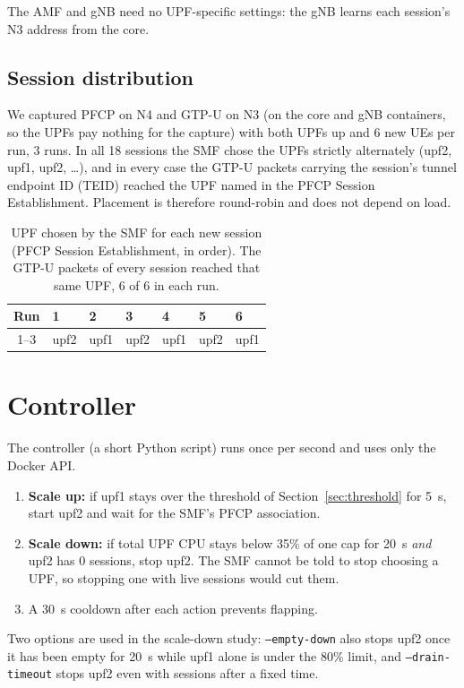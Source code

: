 \documentclass[conference]{IEEEtran}
\begin{document}
The AMF and gNB need no UPF-specific settings: the gNB learns each session's N3 address from the core.

\subsection{Session distribution}
We captured PFCP on N4 and GTP-U on N3 (on the core and gNB containers, so the UPFs pay nothing for the capture) with both UPFs up and 6 new UEs per run, 3 runs. In all 18 sessions the SMF chose the UPFs strictly alternately (upf2, upf1, upf2, \dots), and in every case the GTP-U packets carrying the session's tunnel endpoint ID (TEID) reached the UPF named in the PFCP Session Establishment. Placement is therefore round-robin and does not depend on load.

\begin{table}[t]
\centering
\caption{UPF chosen by the SMF for each new session (PFCP Session Establishment, in order). The GTP-U packets of every session reached that same UPF, 6 of 6 in each run.}
\label{tab:trace}
\footnotesize
\setlength{\tabcolsep}{4pt}
\begin{tabular}{cllllll}
\toprule
Run & 1 & 2 & 3 & 4 & 5 & 6 \\
\midrule
1--3 & upf2 & upf1 & upf2 & upf1 & upf2 & upf1 \\
\bottomrule
\end{tabular}
\end{table}

\section{Controller}\label{sec:ctrl}
The controller (a short Python script) runs once per second and uses only the Docker API.
\begin{enumerate}
\item \textbf{Scale up:} if upf1 stays over the threshold of Section~\ref{sec:threshold} for 5~s, start upf2 and wait for the SMF's PFCP association.
\item \textbf{Scale down:} if total UPF CPU stays below 35\% of one cap for 20~s \emph{and} upf2 has 0 sessions, stop upf2. The SMF cannot be told to stop choosing a UPF, so stopping one with live sessions would cut them.
\item A 30~s cooldown after each action prevents flapping.
\end{enumerate}
Two options are used in the scale-down study: \texttt{--empty-down} also stops upf2 once it has been empty for 20~s while upf1 alone is under the 80\% limit, and \texttt{--drain-timeout} stops upf2 even with sessions after a fixed time.
\end{document}

